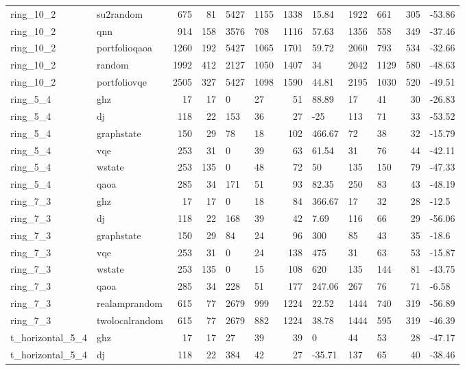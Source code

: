 \begin{longtable}{llrrllrlllrl}
ring\_10\_2 & su2random & 675 & 81 & 5427 & 1155 & 1338 & 15.84 & 1922 & 661 & 305 & -53.86 \\
ring\_10\_2 & qnn & 914 & 158 & 3576 & 708 & 1116 & 57.63 & 1356 & 558 & 349 & -37.46 \\
ring\_10\_2 & portfolioqaoa & 1260 & 192 & 5427 & 1065 & 1701 & 59.72 & 2060 & 793 & 534 & -32.66 \\
ring\_10\_2 & random & 1992 & 412 & 2127 & 1050 & 1407 & 34 & 2042 & 1129 & 580 & -48.63 \\
ring\_10\_2 & portfoliovqe & 2505 & 327 & 5427 & 1098 & 1590 & 44.81 & 2195 & 1030 & 520 & -49.51 \\
ring\_5\_4 & ghz & 17 & 17 & 0 & 27 & 51 & 88.89 & 17 & 41 & 30 & -26.83 \\
ring\_5\_4 & dj & 118 & 22 & 153 & 36 & 27 & -25 & 113 & 71 & 33 & -53.52 \\
ring\_5\_4 & graphstate & 150 & 29 & 78 & 18 & 102 & 466.67 & 72 & 38 & 32 & -15.79 \\
ring\_5\_4 & vqe & 253 & 31 & 0 & 39 & 63 & 61.54 & 31 & 76 & 44 & -42.11 \\
ring\_5\_4 & wstate & 253 & 135 & 0 & 48 & 72 & 50 & 135 & 150 & 79 & -47.33 \\
ring\_5\_4 & qaoa & 285 & 34 & 171 & 51 & 93 & 82.35 & 250 & 83 & 43 & -48.19 \\
ring\_7\_3 & ghz & 17 & 17 & 0 & 18 & 84 & 366.67 & 17 & 32 & 28 & -12.5 \\
ring\_7\_3 & dj & 118 & 22 & 168 & 39 & 42 & 7.69 & 116 & 66 & 29 & -56.06 \\
ring\_7\_3 & graphstate & 150 & 29 & 84 & 24 & 96 & 300 & 85 & 43 & 35 & -18.6 \\
ring\_7\_3 & vqe & 253 & 31 & 0 & 24 & 138 & 475 & 31 & 63 & 53 & -15.87 \\
ring\_7\_3 & wstate & 253 & 135 & 0 & 15 & 108 & 620 & 135 & 144 & 81 & -43.75 \\
ring\_7\_3 & qaoa & 285 & 34 & 228 & 51 & 177 & 247.06 & 267 & 76 & 71 & -6.58 \\
ring\_7\_3 & realamprandom & 615 & 77 & 2679 & 999 & 1224 & 22.52 & 1444 & 740 & 319 & -56.89 \\
ring\_7\_3 & twolocalrandom & 615 & 77 & 2679 & 882 & 1224 & 38.78 & 1444 & 595 & 319 & -46.39 \\
t\_horizontal\_5\_4 & ghz & 17 & 17 & 27 & 39 & 39 & 0 & 44 & 53 & 28 & -47.17 \\
t\_horizontal\_5\_4 & dj & 118 & 22 & 384 & 42 & 27 & -35.71 & 137 & 65 & 40 & -38.46 \\

\end{longtable}
